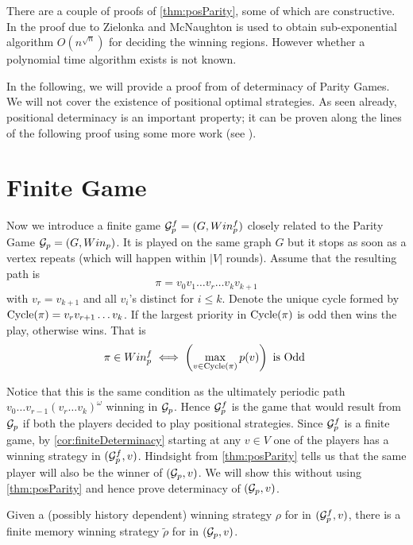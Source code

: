 There are a couple of proofs of \autoref{thm:posParity}, some of which are constructive. In \cite{subexp} the proof due to Zielonka \cite{zielonka_infinite_1998} and McNaughton \cite{mcnaughton_infinite_1993} is used to obtain sub-exponential algorithm $O(n^{\sqrt{n}})$ for deciding the winning regions. However whether a polynomial time algorithm exists is not known.

In the following, we will provide a proof from \cite{bjorklund_memoryless_2004} of determinacy of Parity Games. We will not cover the existence of positional optimal strategies. As seen already, positional determinacy is an important property; it can be proven along the lines of the following proof using some more work (see \cite{bjorklund_memoryless_2004}).

\section{Finite Game}
\label{sec:parityFiniteGame}

Now we introduce a finite game $\mathcal{G}^f_p=(G,Win^f_p)$ closely related to the Parity Game $\mathcal{G}_p=(G,Win_p)$. It is played on the same graph $G$ but it stops as soon as a vertex repeats (which will happen within $|V|$ rounds). Assume that the resulting path is
\[
    \pi = v_0v_1 \ldots v_r \ldots v_k v_{k+1}
\]
with $v_r = v_{k+1}$ and all $v_i$'s distinct for $i \leq k$. Denote the unique cycle formed by $\operatorname{Cycle}(\pi)=v_r v_{r+1} \ldots v_k$. If the largest priority in $\operatorname{Cycle}(\pi)$ is odd then  wins the play, otherwise  wins. That is
\[
    \pi \in Win^f_p \iff \left(\max_{v \in \operatorname{Cycle}(\pi)} p(v)\right) \text{ is Odd }
\]

Notice that this is the same condition as the ultimately periodic path $v_0 \ldots v_{r-1} (v_r \ldots v_k)^\omega$ winning in $\mathcal{G}_p$. Hence $\mathcal{G}^f_p$ is the game that would result from $\mathcal{G}_p$ if both the players decided to play positional strategies. Since $\mathcal{G}^f_p$ is a finite game, by \autoref{cor:finiteDeterminacy} starting at any $v \in V$ one of the players has a winning strategy in $(\mathcal{G}^f_p, v)$. Hindsight from \autoref{thm:posParity} tells us that the same player will also be the winner of $(\mathcal{G}_p,v)$. We will show this without using \autoref{thm:posParity} and hence prove determinacy of $(\mathcal{G}_p,v)$.
\begin{theorem}
    \label{thm:parityDet}
    Given a (possibly history dependent) winning strategy $\rho$ for  in $(\mathcal{G}^f_p,v)$, there is a finite memory winning strategy $\tilde{\rho}$ for  in $(\mathcal{G}_p,v)$.
\end{theorem}

